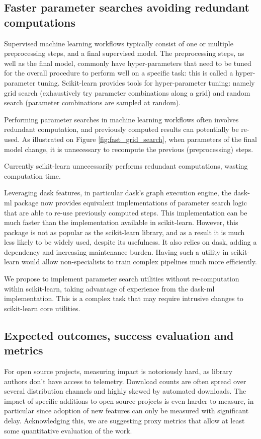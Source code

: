 \documentclass[11pt]{article}  %
\begin{document}
\subsection{Faster parameter searches avoiding redundant computations}

Supervised machine learning workflows typically consist of one or multiple
preprocessing steps, and a final supervised model. The preprocessing steps, as well as the final model, commonly have hyper-parameters that need to be tuned
for the overall procedure to perform well on a specific task: this is called a
hyper-parameter tuning. Scikit-learn provides tools for hyper-parameter tuning: namely grid search (exhaustively try parameter combinations along a grid) and
random search (parameter combinations are sampled at random).

Performing parameter searches in machine learning workflows often involves
redundant computation, and previously computed results can potentially be
re-used. As illustrated on Figure \ref{fig:fast_grid_search}, when parameters of
the final model change, it is unnecessary to recompute the previous
(preprocessing) steps.

Currently scikit-learn unnecessarily performs redundant computations, wasting
computation time.

Leveraging dask features, in particular dask’s graph execution engine, the
dask-ml package now provides equivalent implementations of
parameter search logic that are able to re-use previously computed steps.
This implementation can be much faster than the implementation available in
scikit-learn. However, this package is not as popular as the scikit-learn
library, and as a result it is much less likely to be widely used, despite
its usefulness. It also relies on dask, adding a dependency and increasing
maintenance burden. Having such a utility in scikit-learn would allow
non-specialists to train complex pipelines much more efficiently.

We propose to implement parameter search utilities without re-computation
within scikit-learn, taking advantage of experience from the dask-ml
implementation. This is a complex task that may require intrusive changes to
scikit-learn core utilities.

\subsection{Expected outcomes, success evaluation and metrics}
For open source projects, measuring impact is notoriously hard, as library authors don't have access to telemetry. Download counts are often spread over several distribution channels and highly skewed by automated downloads. The impact of specific additions to open source projects is even harder to measure, in particular since adoption of new features can only be measured with significant delay. Acknowledging this, we are suggesting proxy metrics that allow at least some quantitative evaluation of the work.
\end{document}
